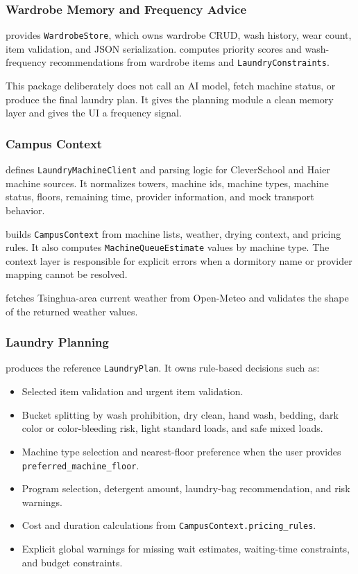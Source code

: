 \documentclass[11pt,a4paper]{article}
\begin{document}
\subsubsection{Wardrobe Memory and Frequency Advice}

 provides \texttt{WardrobeStore}, which owns wardrobe CRUD, wash history, wear count, item validation, and JSON serialization.  computes priority scores and wash-frequency recommendations from wardrobe items and \texttt{LaundryConstraints}.

This package deliberately does not call an AI model, fetch machine status, or produce the final laundry plan. It gives the planning module a clean memory layer and gives the UI a frequency signal.

\subsubsection{Campus Context}

 defines \texttt{LaundryMachineClient} and parsing logic for CleverSchool and Haier machine sources. It normalizes towers, machine ids, machine types, machine status, floors, remaining time, provider information, and mock transport behavior.

 builds \texttt{CampusContext} from machine lists, weather, drying context, and pricing rules. It also computes \texttt{MachineQueueEstimate} values by machine type. The context layer is responsible for explicit errors when a dormitory name or provider mapping cannot be resolved.

 fetches Tsinghua-area current weather from Open-Meteo and validates the shape of the returned weather values.

\subsubsection{Laundry Planning}

 produces the reference \texttt{LaundryPlan}. It owns rule-based decisions such as:

\begin{itemize}
  \item Selected item validation and urgent item validation.
  \item Bucket splitting by wash prohibition, dry clean, hand wash, bedding, dark color or color-bleeding risk, light standard loads, and safe mixed loads.
  \item Machine type selection and nearest-floor preference when the user provides \texttt{preferred\_machine\_floor}.
  \item Program selection, detergent amount, laundry-bag recommendation, and risk warnings.
  \item Cost and duration calculations from \texttt{CampusContext.pricing\_rules}.
  \item Explicit global warnings for missing wait estimates, waiting-time constraints, and budget constraints.
\end{itemize}
\end{document}
